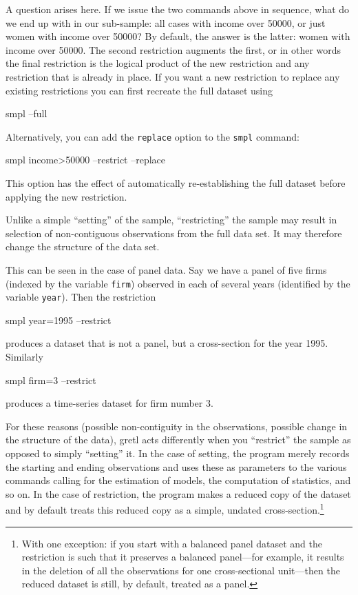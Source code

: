 A question arises here.  If we issue the two commands above in
sequence, what do we end up with in our sub-sample: all cases with
income over 50000, or just women with income over 50000? By default,
the answer is the latter: women with income over 50000.  The second
restriction augments the first, or in other words the final
restriction is the logical product of the new restriction and any
restriction that is already in place.  If you want a new restriction
to replace any existing restrictions you can first recreate the full
dataset using
%
\begin{code}
smpl --full
\end{code}
%
Alternatively, you can add the \verb+replace+ option to the
\verb+smpl+ command:
%
\begin{code}
smpl income>50000 --restrict --replace
\end{code}

This option has the effect of automatically re-establishing the full
dataset before applying the new restriction.

Unlike a simple ``setting'' of the sample, ``restricting'' the sample
may result in selection of non-contiguous observations from the full
data set.  It may therefore change the structure of the data set.

This can be seen in the case of panel data.  Say we have a panel of
five firms (indexed by the variable \verb+firm+) observed in each of
several years (identified by the variable \verb+year+).  Then the
restriction
%
\begin{code}
smpl year=1995 --restrict
\end{code}
%
produces a dataset that is not a panel, but a cross-section for the
year 1995.  Similarly
%
\begin{code}
smpl firm=3 --restrict
\end{code}
%
produces a time-series dataset for firm number 3.

For these reasons (possible non-contiguity in the observations,
possible change in the structure of the data), gretl acts differently
when you ``restrict'' the sample as opposed to simply ``setting'' it.
In the case of setting, the program merely records the starting and
ending observations and uses these as parameters to the various
commands calling for the estimation of models, the computation of
statistics, and so on. In the case of restriction, the program makes a
reduced copy of the dataset and by default treats this reduced copy as
a simple, undated cross-section.\footnote{With one exception: if you
  start with a balanced panel dataset and the restriction is such that
  it preserves a balanced panel---for example, it results in the
  deletion of all the observations for one cross-sectional unit---then
  the reduced dataset is still, by default, treated as a panel.}

